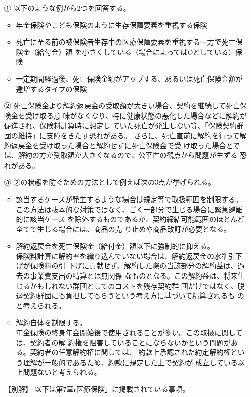 \documentclass[report,gutter=10mm,fore-edge=10mm,uplatex,dvipdfmx]{jlreq}
\begin{document}
\begin{itemize}
 \item [①] 以下のような例から2つを回答する。
\begin{itemize}
 \item 年金保険やこども保険のように生存保障要素を重視する保険
 \item 死亡に至る前の被保険者生存中の医療保障要素を重視する一方で死亡保険金（給付金）額
を小さくしている（場合によってはOとしている）保険
 \item 一定期間経過後、死亡保険金額がアップする、あるいは死亡保険金額が逓増するタイプの保険
\end{itemize}
 \item [②]死亡保険金より解約返戻金の受取額が大きい場合、契約を継続して死亡保険金を受け取る意
味がなくなり、特に健康状態の悪化した場合などに解約が促進され、保険料計算時に想定し
ていた死亡が発生しない等、「保険契約群団の維持」に支障をきたす恐れがある。
さらに、死亡直前に解約を行って解約返戻金を受け取った場合と解約せずに死亡保険金で受
け取った場合とでは、解約の方が受取額が大きくなるので、公平性の観点から問題が生ずる
恐れがある。
 \item  [③] ②の状態を防ぐための方法として例えば次の3点が挙げられる。
\begin{itemize}
 \item 該当するケースが発生するような場合は規定等で取扱範囲を制限する。\\
この方法は抜本的な対策ではなく、ごく一部分で生じる場合に緊急避難的に該当ケース
を除外するものであるが、契約締結可能範囲のほとんど全てで生じる場合には、商品の売
り止めや商品改訂が必要となる。
 \item 解約返戻金を死亡保険金（給付金）額以下に強制的に抑える。\\
保険料計算に解約率を織り込んでいない場合は、解約返戻金の水準引下げが保険料の引
下げに貢献せず、解約した際の当該部分の解約益は、過去の事業費支出の精算とは無関係
なものとなる。この解約益は、将来生じるかもしれない群団としてのコストを残存契約群
団だけではなく、脱退契約群団にも負担してもらうという考え方に基づいて精算されるも
のと考えられる。
 \item 解約自体を制限する。\\
年金保険の終身年金開始後で使用されることが多い。この取扱に関しては、契約者の解
約権を阻害していることにならないかという問題がある。契約者の任意解約権に関しては、
約款上承認された約定解約権という理解が一般的であるため、約款に規定した上で契約が
成立している以上問題ないと考えられる。
\end{itemize}
 \item [【別解】]以下は第7章r医療保険」に掲載されている事項。

\end{itemize}
\end{document}
